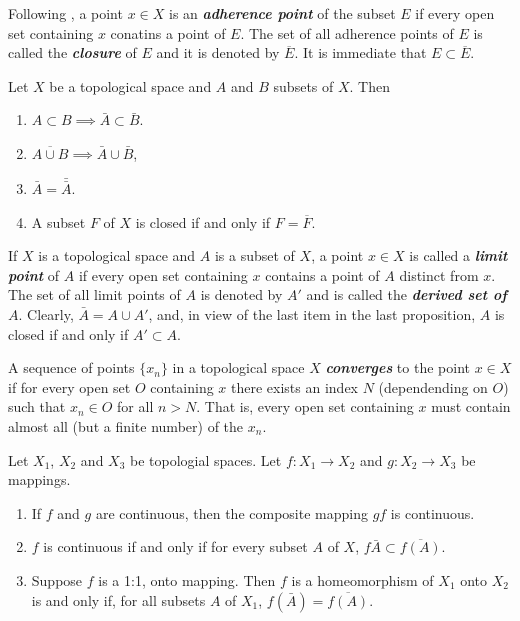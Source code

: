 \documentclass{article}
\theoremstyle{definition}
\numberwithin{equation}{section}
\begin{document}
	Following \cite{narici}, a point $x\in X$ is an \textbf{\textit{adherence point}} of the subset $E$ if every open set containing $x$ conatins a point of $E$. The set of all adherence points of $E$ is called the \textbf{\textit{closure}} of $E$ and it is denoted by $\overline{E}$. It is immediate that $E\subset\overline{E}$.
	\begin{prop}
		Let $X$ be a topological space and $A$ and $B$ subsets of $X$. Then
		\begin{enumerate}
			\item $A\subset B\implies\bar{A}\subset\bar{B}$.
			\item $\overline{A\cup B}\implies\bar{A}\cup\bar{B}$,
			\item $\bar{A}=\bar{\bar{A}}$.
			\item A subset $F$ of $X$ is closed if and only if $F=\overline{F}$.
		\end{enumerate}
	\end{prop}
	If $X$ is a topological space and $A$ is a subset of $X$, a point $x\in X$ is called a \textbf{\textit{limit point}} of $A$ if every open set containing $x$ contains a point of $A$ distinct from $x$. The set of all limit points of $A$ is denoted by $A'$ and is called the \textbf{\textit{derived set of $A$}}. Clearly, $\bar{A}=A\cup A'$, and, in view of the last item in the last proposition, $A$ is closed if and only if $A'\subset A$.
	
	A sequence of points $\{x_n\}$ in a topological space $X$ \textbf{\textit{converges}} to the point $x\in X$ if for every open set $O$ containing $x$ there exists an index $N$ (dependending on $O$) such that $x_n\in O$ for all $n>N$. That is, every open set containing $x$ must contain almost all (but a finite number) of the $x_n$.
	
	\begin{prop} Let $X_1$, $X_2$ and $X_3$ be topologial spaces. Let $f:X_1\to X_2$ and $g:X_2\to X_3$ be mappings.
		\begin{enumerate} 
			\item If $f$ and $g$ are continuous, then the composite mapping $gf$ is continuous.
			\item $f$ is continuous if and only if for every subset $A$ of $X$, $f\bar{A}\subset\overline{f(A)}$.
			\item Suppose $f$ is a 1:1, onto mapping. Then $f$ is a homeomorphism of $X_1$ onto $X_2$ is and only if, for all subsets $A$ of $X_1$, $f(\bar{A})=\overline{f(A)}$.
		\end{enumerate}
	\end{prop}
	
\end{document}
